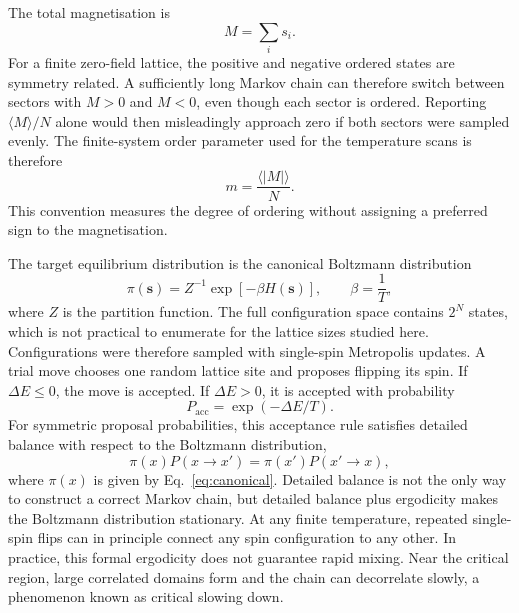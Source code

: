 \documentclass[twoside,twocolumn,9pt]{extarticle}
\begin{document}
The total magnetisation is
\begin{equation}
  M = \sum_i s_i .
  \label{eq:magnetisation}
\end{equation}
For a finite zero-field lattice, the positive and negative ordered states are symmetry related. A sufficiently long Markov chain can therefore switch between sectors with \(M>0\) and \(M<0\), even though each sector is ordered. Reporting \(\langle M\rangle/N\) alone would then misleadingly approach zero if both sectors were sampled evenly. The finite-system order parameter used for the temperature scans is therefore
\begin{equation}
  m=\frac{\langle |M|\rangle}{N}.
  \label{eq:abs_m}
\end{equation}
This convention measures the degree of ordering without assigning a preferred sign to the magnetisation.

The target equilibrium distribution is the canonical Boltzmann distribution
\begin{equation}
  \pi(\mathbf{s}) = Z^{-1}\exp[-\beta H(\mathbf{s})],\qquad \beta=\frac{1}{T},
  \label{eq:canonical}
\end{equation}
where \(Z\) is the partition function. The full configuration space contains \(2^N\) states, which is not practical to enumerate for the lattice sizes studied here. Configurations were therefore sampled with single-spin Metropolis updates.\cite{metropolis1953,newman1999,landau2021} A trial move chooses one random lattice site and proposes flipping its spin. If \(\Delta E\leq0\), the move is accepted. If \(\Delta E>0\), it is accepted with probability
\begin{equation}
  P_{\mathrm{acc}}=\exp(-\Delta E/T).
  \label{eq:acceptance}
\end{equation}
For symmetric proposal probabilities, this acceptance rule satisfies detailed balance with respect to the Boltzmann distribution,
\begin{equation}
  \pi(x)P(x\rightarrow x')=\pi(x')P(x'\rightarrow x),
  \label{eq:detailedbalance}
\end{equation}
where \(\pi(x)\) is given by Eq.~\eqref{eq:canonical}. Detailed balance is not the only way to construct a correct Markov chain, but detailed balance plus ergodicity makes the Boltzmann distribution stationary. At any finite temperature, repeated single-spin flips can in principle connect any spin configuration to any other. In practice, this formal ergodicity does not guarantee rapid mixing. Near the critical region, large correlated domains form and the chain can decorrelate slowly, a phenomenon known as critical slowing down.\cite{newman1999,sokal1989}
\end{document}
